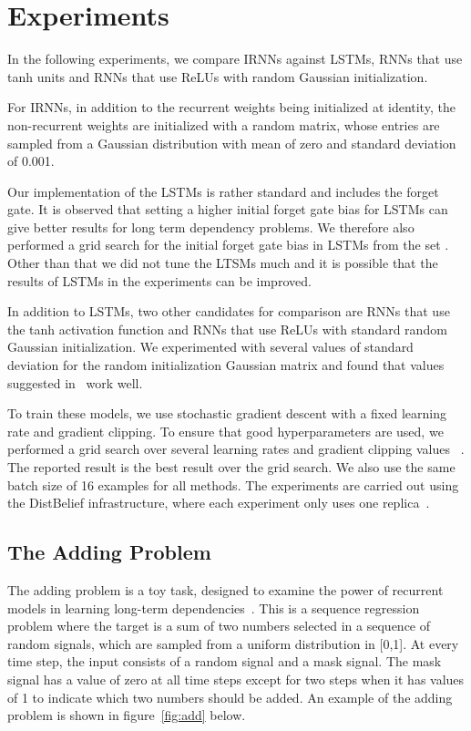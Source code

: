 \documentclass{article} \usepackage{nips14submit_e,times,graphicx}
\begin{document}
\section{Experiments}
In the following experiments, we compare IRNNs against LSTMs, RNNs
that use tanh units and RNNs that use ReLUs with random Gaussian
initialization.



For IRNNs, in addition to the recurrent weights being initialized at
identity, the non-recurrent weights are initialized with a random
matrix, whose entries are sampled from a Gaussian distribution with
mean of zero and standard deviation of 0.001.

Our implementation of the LSTMs is rather standard and includes the
forget gate. It is observed that setting a higher initial forget gate
bias for LSTMs can give better results for long term dependency
problems. We therefore also performed a grid search for the initial
forget gate bias in LSTMs from the set . Other than that we did not tune the LTSMs much and it is
possible that the results of LSTMs in the experiments can be improved.

In addition to LSTMs, two other candidates for comparison are RNNs
that use the tanh activation function and RNNs that use ReLUs with
standard random Gaussian initialization. We experimented with several
values of standard deviation for the random initialization Gaussian
matrix and found that values suggested in~\cite{sussillo2015} work
well.

To train these models, we use stochastic gradient descent with a fixed
learning rate and gradient clipping. To ensure that good
hyperparameters are used, we performed a grid search over several
learning rates  and gradient
clipping values ~\cite{graves13c,sutskever14}. The reported result is the best
result over the grid search. We also use the same batch size of 16
examples for all methods. The experiments are carried out using the
DistBelief infrastructure, where each experiment only uses one
replica~\cite{le12,dean12}.


\subsection{The Adding Problem}
The adding problem is a toy task, designed to examine the power of
recurrent models in learning long-term
dependencies~\cite{hochreiter97,hoch01}. This is a sequence regression
problem where the target is a sum of two numbers selected in a
sequence of random signals, which are sampled from a uniform
distribution in [0,1]. At every time step, the input consists of a
random signal and a mask signal. The mask signal has a value of zero
at all time steps except for two steps when it has values of 1 to
indicate which two numbers should be added. An example of the adding
problem is shown in figure~\ref{fig:add} below.
\end{document}
